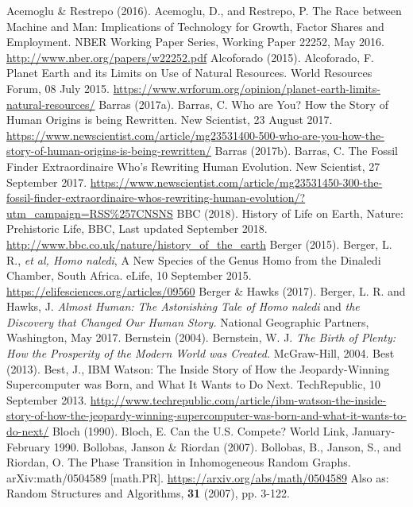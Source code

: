 \begin{multicols}{2}
\begin{thebibliography}{99}
 Acemoglu \& Restrepo (2016). Acemoglu, D., and Restrepo, P. The Race between Machine and Man: Implications of Technology for Growth, Factor Shares and Employment. NBER Working Paper Series, Working Paper 22252, May 2016. \url{http://www.nber.org/papers/w22252.pdf}
 Alcoforado (2015). Alcoforado, F. Planet Earth and its Limits on Use of Natural Resources. World Resources Forum, 08 July 2015. \url{https://www.wrforum.org/opinion/planet-earth-limits-natural-resources/}
 Barras (2017a). Barras, C. Who are You? How the Story of Human Origins is being Rewritten. New Scientist, 23 August 2017. \url{https://www.newscientist.com/article/mg23531400-500-who-are-you-how-the-story-of-human-origins-is-being-rewritten/}
 Barras (2017b). Barras, C. The Fossil Finder Extraordinaire Who's Rewriting Human Evolution. New Scientist, 27 September 2017. \url{https://www.newscientist.com/article/mg23531450-300-the-fossil-finder-extraordinaire-whos-rewriting-human-evolution/?utm_campaign=RSS%257CNSNS}
 BBC (2018). History of Life on Earth, Nature: Prehistoric Life, BBC, Last updated September 2018. \url{http://www.bbc.co.uk/nature/history_of_the_earth}
 Berger (2015). Berger, L. R., \textit{et al, Homo naledi}, A New Species of the Genus Homo from the Dinaledi Chamber, South Africa. eLife, 10 September 2015. \url{https://elifesciences.org/articles/09560}
 Berger \& Hawks (2017). Berger, L. R. and Hawks, J. \textit{Almost Human: The Astonishing Tale of Homo naledi} and \textit{the Discovery that Changed Our Human Story.} National Geographic Partners, Washington, May 2017.
 Bernstein (2004). Bernstein, W. J. \textit{The Birth of Plenty: How the Prosperity of the Modern World was Created.} McGraw-Hill, 2004.
 Best (2013). Best, J., IBM Watson: The Inside Story of How the Jeopardy-Winning Supercomputer was Born, and What It Wants to Do Next. TechRepublic, 10 September 2013. \url{http://www.techrepublic.com/article/ibm-watson-the-inside-story-of-how-the-jeopardy-winning-supercomputer-was-born-and-what-it-wants-to-do-next/}
 Bloch (1990). Bloch, E. Can the U.S. Compete? World Link, January-February 1990.
 Bollobas, Janson \& Riordan (2007). Bollobas, B., Janson, S., and Riordan, O. The Phase Transition in Inhomogeneous Random Graphs. arXiv:math/0504589 [math.PR]. \url{https://arxiv.org/abs/math/0504589} Also as: Random Structures and Algorithms, \textbf{31} (2007), pp. 3-122.

\end{thebibliography}
\end{multicols}
